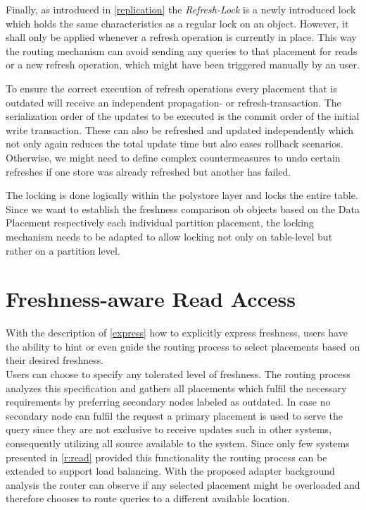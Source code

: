 Finally, as introduced in \ref{replication} the \emph{Refresh-Lock} is a newly introduced lock which holds the same characteristics as a regular lock on an object.
However, it shall only be applied whenever a refresh operation is currently in place. This way the routing mechanism can avoid sending any queries to that placement
for reads or a new refresh operation, which might have been triggered manually by an user.

To ensure the correct execution of refresh operations every placement that is outdated will receive an independent propagation- or refresh-transaction.
The serialization order of the updates to be executed is the commit order of the initial write transaction.
These can also be refreshed and updated independently which not only again reduces the total update time but also eases rollback scenarios.
Otherwise, we might need to define complex countermeasures to undo certain refreshes if one store was already refreshed but another has failed.


The locking is done logically within the polystore layer and locks the entire table.
Since we want to establish the freshness comparison ob objects based on the Data Placement respectively each individual partition placement, the locking mechanism
needs to be adapted to allow locking not only on table-level but rather on a partition level. 


\section{Freshness-aware Read Access}

With the description of \ref{express} how to explicitly express freshness, users have the ability to hint or even guide the routing process to select placements 
based on their desired freshness.\\
Users can choose to specify any tolerated level of freshness. The routing process analyzes this specification and gathers all placements which fulfil the necessary 
requirements by preferring secondary nodes labeled as outdated.
In case no secondary node can fulfil the request a primary placement is used to serve the query since they are not exclusive to receive updates such in other systems,
consequently utilizing all source available to the system.
Since only few systems presented in \ref{r:read} provided this functionality the routing process can be extended to support load balancing. 
With the proposed adapter background analysis the router can observe if any selected placement might be overloaded and therefore chooses to route 
queries to a different available location. \\



